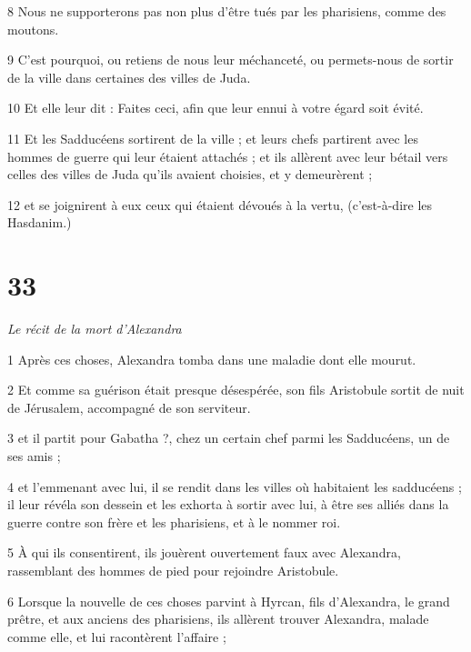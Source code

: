 \par 8 Nous ne supporterons pas non plus d'être tués par les pharisiens, comme des moutons.

\par 9 C'est pourquoi, ou retiens de nous leur méchanceté, ou permets-nous de sortir de la ville dans certaines des villes de Juda.

\par 10 Et elle leur dit : Faites ceci, afin que leur ennui à votre égard soit évité.

\par 11 Et les Sadducéens sortirent de la ville ; et leurs chefs partirent avec les hommes de guerre qui leur étaient attachés ; et ils allèrent avec leur bétail vers celles des villes de Juda qu'ils avaient choisies, et y demeurèrent ;

\par 12 et se joignirent à eux ceux qui étaient dévoués à la vertu, (c'est-à-dire les Hasdanim.)

\chapter{33}

\par \textit{Le récit de la mort d'Alexandra}

\par 1 Après ces choses, Alexandra tomba dans une maladie dont elle mourut.

\par 2 Et comme sa guérison était presque désespérée, son fils Aristobule sortit de nuit de Jérusalem, accompagné de son serviteur.

\par 3 et il partit pour Gabatha ?, chez un certain chef parmi les Sadducéens, un de ses amis ;

\par 4 et l'emmenant avec lui, il se rendit dans les villes où habitaient les sadducéens ; il leur révéla son dessein et les exhorta à sortir avec lui, à être ses alliés dans la guerre contre son frère et les pharisiens, et à le nommer roi.

\par 5 À qui ils consentirent, ils jouèrent ouvertement faux avec Alexandra, rassemblant des hommes de pied pour rejoindre Aristobule.

\par 6 Lorsque la nouvelle de ces choses parvint à Hyrcan, fils d'Alexandra, le grand prêtre, et aux anciens des pharisiens, ils allèrent trouver Alexandra, malade comme elle, et lui racontèrent l'affaire ;

